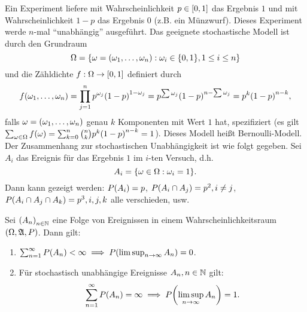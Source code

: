 \documentclass{lecture}
\begin{document}
    \begin{example}
        Ein Experiment liefere mit Wahrscheinlichkeit \(p \in \brackets*{0, 1}\) das Ergebnis \(1\) und mit Wahrscheinlichkeit \(1 - p\) das Ergebnis \(0\) (z.B. ein Münzwurf).
        Dieses Experiment werde \(n\)-mal ``unabhängig'' ausgeführt.
        Das geeignete stochastische Modell ist durch den Grundraum
        \[
            \Omega = \braces*{\omega = \parentheses*{\omega_1, \ldots, \omega_n} : \omega_i \in \braces*{0, 1}, 1 \le i \le n}
        \]
        und die Zähldichte \(f: \Omega \to \brackets*{0, 1}\) definiert durch
        \[
            f\parentheses*{\omega_1, \ldots, \omega_n} = \prod_{j = 1}^n p^{\omega_j}\parentheses*{1 - p}^{1 - \omega_j} = p^{\sum\omega_j}\parentheses*{1 - p}^{n - \sum\omega_j} = p^k\parentheses*{1 - p}^{n - k},
        \]
        falls \(\omega = \parentheses*{\omega_1, \ldots, \omega_n}\) genau \(k\) Komponenten mit Wert \(1\) hat, spezifiziert (es gilt \(\sum_{\omega \in \Omega}f\parentheses*{\omega} = \sum_{k = 0}^n\binom{n}{k}p^k\parentheses*{1 - p}^{n - k} = 1\)).
        Dieses Modell heißt Bernoulli-Modell.
        Der Zusammenhang zur stochastischen Unabhängigkeit ist wie folgt gegeben.
        Sei \(A_i\) das Ereignis für das Ergebnis \(1\) im \(i\)-ten Versuch, d.h.
        \[
            A_i = \braces*{\omega \in \Omega : \omega_i = 1}.
        \]
        Dann kann gezeigt werden: \(P\parentheses*{A_i} = p\), \(P\parentheses*{A_i \cap A_j} = p^2, i \ne j\), \(P\parentheses*{A_i \cap A_j \cap A_k} = p^3, i, j, k\) alle verschieden, usw.
    \end{example}

    \begin{lemma}
        Sei \(\parentheses*{A_n}_{n \in \N}\) eine Folge von Ereignissen in einem Wahrscheinlichkeitsraum \(\parentheses*{\Omega, \mathfrak{A}, P}\).
        Dann gilt:
        \begin{enumerate}
            \item \(\sum_{n = 1}^\infty P\parentheses*{A_n} < \infty \implies P\parentheses*{\limsup_{n \to \infty}A_n} = 0\).
            \item Für stochastisch unabhängige Ereignisse \(A_n, n \in \N\) gilt:
            \[
                \sum_{n = 1}^\infty P\parentheses*{A_n} = \infty \implies P\parentheses*{\limsup_{n \to \infty}A_n} = 1.
            \]
        \end{enumerate}
    \end{lemma}
\end{document}
